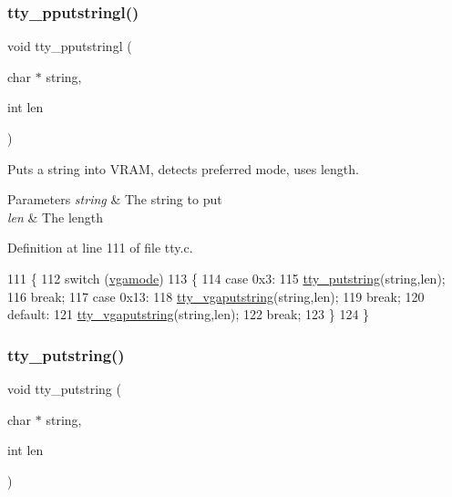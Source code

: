 \subsubsection{\texorpdfstring{tty\+\_\+pputstringl()}{tty\_pputstringl()}}
{\footnotesize\ttfamily void tty\+\_\+pputstringl (\begin{DoxyParamCaption}\item[{char $\ast$}]{string,  }\item[{int}]{len }\end{DoxyParamCaption})}



Puts a string into V\+R\+AM, detects preferred mode, uses length. 


\begin{DoxyParams}{Parameters}
{\em string} & The string to put \\
\hline
{\em len} & The length \\
\hline
\end{DoxyParams}


Definition at line 111 of file tty.\+c.


\begin{DoxyCode}
111                                             \{
112     \textcolor{keywordflow}{switch} (\hyperlink{a00167_af93b0649fdd1bea5b6d29ed37205aa2c_af93b0649fdd1bea5b6d29ed37205aa2c}{vgamode})
113     \{
114     \textcolor{keywordflow}{case} 0x3:
115         \hyperlink{a00167_a5b5bf610a57f3c59b2851fa2652081ec_a5b5bf610a57f3c59b2851fa2652081ec}{tty\_putstring}(\textcolor{keywordtype}{string},len);
116         \textcolor{keywordflow}{break};
117     \textcolor{keywordflow}{case} 0x13:
118         \hyperlink{a00167_a05ca3f5e64f38fec173b635ca8465415_a05ca3f5e64f38fec173b635ca8465415}{tty\_vgaputstring}(\textcolor{keywordtype}{string},len);
119         \textcolor{keywordflow}{break};
120     \textcolor{keywordflow}{default}:
121         \hyperlink{a00167_a05ca3f5e64f38fec173b635ca8465415_a05ca3f5e64f38fec173b635ca8465415}{tty\_vgaputstring}(\textcolor{keywordtype}{string},len);
122         \textcolor{keywordflow}{break};
123     \}
124 \}
\end{DoxyCode}
\mbox{\label{a00170_a5b5bf610a57f3c59b2851fa2652081ec_a5b5bf610a57f3c59b2851fa2652081ec}} 
\subsubsection{\texorpdfstring{tty\+\_\+putstring()}{tty\_putstring()}}
{\footnotesize\ttfamily void tty\+\_\+putstring (\begin{DoxyParamCaption}\item[{char $\ast$}]{string,  }\item[{int}]{len }\end{DoxyParamCaption})}



